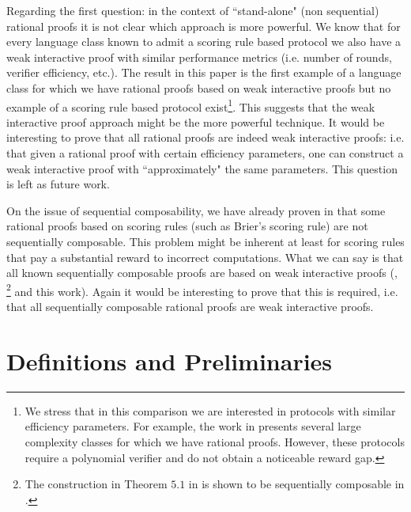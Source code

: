 Regarding the first question: in the context of ``stand-alone" (non sequential) rational proofs it is not clear which approach is more powerful. We know that for every language class known to admit a scoring rule based protocol we also have a weak interactive proof with similar performance metrics (i.e. number of rounds, verifier efficiency, etc.). The result in this paper is the first example of a language class for which we have rational proofs based on weak interactive proofs but no example of a scoring rule based protocol exist\footnote{
	We stress that in this comparison we are interested in protocols with similar efficiency parameters. For example, the work in \cite{am} presents several large complexity classes for which we have rational proofs. However, these protocols require a polynomial verifier and do not obtain a noticeable reward gap.}.
This suggests that the weak interactive proof approach might be the more powerful technique. It would be interesting to prove that all rational proofs are indeed weak interactive proofs: i.e. that given a rational proof with certain efficiency parameters, one can construct a weak interactive proof with ``approximately" the same parameters. This question is left as future work.

On the issue of sequential composability, we have already proven in \cite{cg15} that some rational proofs based on scoring rules (such as Brier's scoring rule) are not  sequentially composable. 
This problem might be inherent at least for scoring rules that pay a substantial reward to incorrect computations. What we can say is that all known sequentially composable proofs are based on weak interactive proofs (\cite{cg15}, \cite{am1}\footnote{The construction in Theorem $5.1$ in \cite{am1} is shown to be sequentially composable in \cite{cg15}.} and this work). Again it would be interesting to prove that this is required, i.e. that all sequentially composable rational proofs are weak interactive proofs. 



\section{Definitions and Preliminaries}

